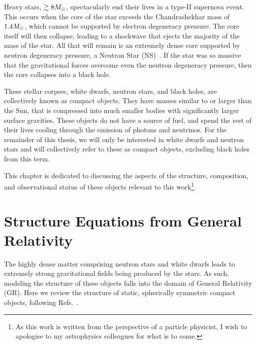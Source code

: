 Heavy stars, $\gtrsim 8M_\odot$, spectacularly end their lives in a type-II supernova event. This occurs when the core of the star exceeds the Chandrashekhar mass of $1.4M_\odot$, which cannot be supported by electron degeneracy pressure. The core itself will then collapse, leading to a shockwave that ejects the majority of the mass of the star. All that will remain is an extremely dense core supported by neutron degeneracy pressure, a Neutron Star (NS)~\cite{Woosley:2005cha_PhysicsCoreCollapseSupernovae}. If the star was so massive that the gravitational forces overcome even the neutron degeneracy pressure, then the core collapses into a black hole. 

These stellar corpses, white dwarfs, neutron stars, and black holes, are collectively known as compact objects. They have masses similar to or larger than the Sun, that is compressed into much smaller bodies with significantly larger surface gravities. These objects do not have a source of fuel, and spend the rest of their lives cooling through the emission of photons and neutrinos. For the remainder of this thesis, we will only be interested in white dwarfs and neutron stars and will collectively refer to these as compact objects, excluding black holes from this term. 

This chapter is dedicated to discussing the aspects of the structure, composition, and observational status of these objects relevant to this work\footnote{As this work is written from the perspective of a particle physicist, I wish to apologise to my astrophysics colleagues for what is to come.}. 

\section{Structure Equations from General Relativity}

The highly dense matter comprising neutron stars and white dwarfs leads to extremely strong gravitational fields being produced by the stars. As such, modeling the structure of these objects falls into the domain of General Relativity (GR). Here we review the structure of static, spherically symmetric compact objects, following Refs.~\cite{Shapiro_Blackholeswhite, Misner_Gravitation, Schutz_Firstcoursegeneral}. 

